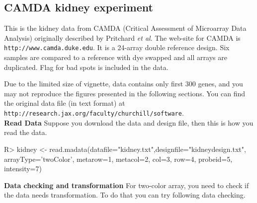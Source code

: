 \subsection{CAMDA kidney experiment}
This is the kidney data from CAMDA (Critical Assessment 
of Microarray Data Analysis) originally described by Pritchard {\it et al}. The web-site for CAMDA is 
{\tt http://www.camda.duke.edu}. It is a 24-array double reference
design. Six samples are compared to a reference with dye swapped
and all arrays are duplicated. Flag for bad spots is included in the 
data. 

Due to the limited size of vignette, data contains only first 300 genes, and you
may not reproduce the figures presented in the following sections. You can find the original data file (in text format) at {\tt
http://research.jax.org/faculty/churchill/software}.\\ 
{\bf Read Data} Suppose you download the data and design file, then this is how you read the data. 
\begin{Sinput}
R> kidney <- read.madata(datafile="kidney.txt",designfile="kidneydesign.txt",
   arrayType='twoColor', metarow=1, metacol=2, col=3, row=4, probeid=5, intensity=7)
\end{Sinput}
{\bf Data checking and transformation} For two-color array, you need to check
if the data needs transformation. To do that you can try following data checking.  
